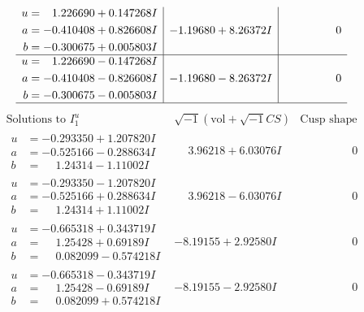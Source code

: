 \documentclass[1p]{elsarticle_modified}
\theoremstyle{definition}
\newcommand{\I}{\sqrt{-1}}
\begin{document}
$$\begin{array}{c|c|c}
\begin{aligned}
u &= \phantom{-}1.226690 + 0.147268 I \\
a &= -0.410408 + 0.826608 I \\
b &= -0.300675 + 0.005803 I\end{aligned}
 & -1.19680 + 8.26372 I & \phantom{-0.000000 } 0 \\ \hline\begin{aligned}
u &= \phantom{-}1.226690 - 0.147268 I \\
a &= -0.410408 - 0.826608 I \\
b &= -0.300675 - 0.005803 I\end{aligned}
 & -1.19680 - 8.26372 I & \phantom{-0.000000 } 0\\
 \hline 
 \end{array}$$\newpage$$\begin{array}{c|c|c}  
\text{Solutions to }I^u_{1}& \I (\text{vol} + \sqrt{-1}CS) & \text{Cusp shape}\\
 \hline 
\begin{aligned}
u &= -0.293350 + 1.207820 I \\
a &= -0.525166 - 0.288634 I \\
b &= \phantom{-}1.24314 - 1.11002 I\end{aligned}
 & \phantom{-}3.96218 + 6.03076 I & \phantom{-0.000000 } 0 \\ \hline\begin{aligned}
u &= -0.293350 - 1.207820 I \\
a &= -0.525166 + 0.288634 I \\
b &= \phantom{-}1.24314 + 1.11002 I\end{aligned}
 & \phantom{-}3.96218 - 6.03076 I & \phantom{-0.000000 } 0 \\ \hline\begin{aligned}
u &= -0.665318 + 0.343719 I \\
a &= \phantom{-}1.25428 + 0.69189 I \\
b &= \phantom{-}0.082099 - 0.574218 I\end{aligned}
 & -8.19155 + 2.92580 I & \phantom{-0.000000 } 0 \\ \hline\begin{aligned}
u &= -0.665318 - 0.343719 I \\
a &= \phantom{-}1.25428 - 0.69189 I \\
b &= \phantom{-}0.082099 + 0.574218 I\end{aligned}
 & -8.19155 - 2.92580 I & \phantom{-0.000000 } 0 \\ \hline\begin{aligned}

\end{aligned}
\end{array}$$
\end{document}
